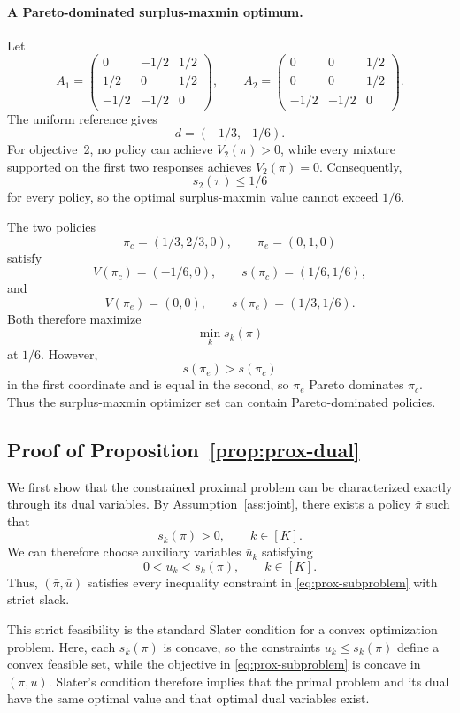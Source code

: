 \documentclass{article}
\theoremstyle{remark}
\theoremstyle{plain}
\begin{document}
\paragraph{A Pareto-dominated surplus-maxmin optimum.}
Let
\[
A_1=
\begin{pmatrix}
0&-1/2&1/2\\
1/2&0&1/2\\
-1/2&-1/2&0
\end{pmatrix},
\qquad
A_2=
\begin{pmatrix}
0&0&1/2\\
0&0&1/2\\
-1/2&-1/2&0
\end{pmatrix}.
\]
The uniform reference gives
\[
d=(-1/3,-1/6).
\]
For objective~2, no policy can achieve $V_2(\pi)>0$, while every mixture
supported on the first two responses achieves $V_2(\pi)=0$.
Consequently,
\[
s_2(\pi)\le 1/6
\]
for every policy, so the optimal surplus-maxmin value cannot exceed
$1/6$.

The two policies
\[
\pi_c=(1/3,2/3,0),
\qquad
\pi_e=(0,1,0)
\]
satisfy
\[
V(\pi_c)=(-1/6,0),
\qquad
s(\pi_c)=(1/6,1/6),
\]
and
\[
V(\pi_e)=(0,0),
\qquad
s(\pi_e)=(1/3,1/6).
\]
Both therefore maximize
\[
\min_k s_k(\pi)
\]
at $1/6$. However,
\[
s(\pi_e)>s(\pi_c)
\]
in the first coordinate and is equal in the second, so
$\pi_e$ Pareto dominates $\pi_c$. Thus the surplus-maxmin optimizer set
can contain Pareto-dominated policies.

\subsection{Proof of Proposition~\ref{prop:prox-dual}}
\label{app:prox-dual}
We first show that the constrained proximal problem can be characterized exactly
through its dual variables. By Assumption~\ref{ass:joint}, there exists a policy
$\bar\pi$ such that
\[
s_k(\bar\pi)>0,
\qquad k\in[K].
\]
We can therefore choose auxiliary variables $\bar u_k$ satisfying
\[
0<\bar u_k<s_k(\bar\pi),
\qquad k\in[K].
\]
Thus, $(\bar\pi,\bar u)$ satisfies every inequality constraint in
\eqref{eq:prox-subproblem} with strict slack.

This strict feasibility is the standard Slater condition for a convex
optimization problem. Here, each $s_k(\pi)$ is concave, so the constraints
$u_k\le s_k(\pi)$ define a convex feasible set, while the objective in
\eqref{eq:prox-subproblem} is concave in $(\pi,u)$. Slater's condition therefore
implies that the primal problem and its dual have the same optimal value and that
optimal dual variables exist.
\end{document}
